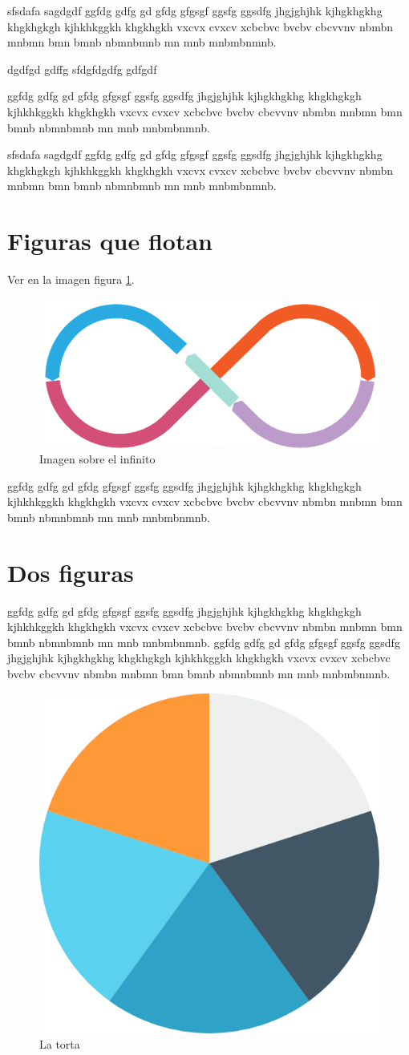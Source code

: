 \documentclass[a4paper,11pt]{article}
\begin{document}
\begin{flushleft}
\begin{minipage}{0.99\textwidth}
			sfsdafa sagdgdf ggfdg gdfg gd gfdg gfgsgf ggsfg ggsdfg jhgjghjhk kjhgkhgkhg khgkhgkgh kjhkhkggkh khgkhgkh vxcvx cvxcv xcbcbvc bvcbv cbcvvnv nbmbn mnbmn bmn bmnb nbmnbmnb mn mnb mnbmbnmnb.
			
			dgdfgd gdffg sfdgfdgdfg gdfgdf
			
			ggfdg gdfg gd gfdg gfgsgf ggsfg ggsdfg jhgjghjhk kjhgkhgkhg khgkhgkgh kjhkhkggkh khgkhgkh vxcvx cvxcv xcbcbvc bvcbv cbcvvnv nbmbn mnbmn bmn bmnb nbmnbmnb mn mnb mnbmbnmnb.
			
			sfsdafa sagdgdf ggfdg gdfg gd gfdg gfgsgf ggsfg ggsdfg jhgjghjhk kjhgkhgkhg khgkhgkgh kjhkhkggkh khgkhgkh vxcvx cvxcv xcbcbvc bvcbv cbcvvnv nbmbn mnbmn bmn bmnb nbmnbmnb mn mnb mnbmbnmnb.
		\end{minipage}
		
		
		\section{Figuras que flotan}
		Ver en la imagen figura \ref{fig:flujo4}.
		\begin{figure}[H]
			\centering
			\includegraphics[width=0.6\linewidth]{flujo}
			\caption{Imagen sobre el infinito}
			\label{fig:flujo4}
		\end{figure}
		ggfdg gdfg gd gfdg gfgsgf ggsfg ggsdfg jhgjghjhk kjhgkhgkhg khgkhgkgh kjhkhkggkh khgkhgkh vxcvx cvxcv xcbcbvc bvcbv cbcvvnv nbmbn mnbmn bmn bmnb nbmnbmnb mn mnb mnbmbnmnb.
		
		
		\section{Dos figuras}
		ggfdg gdfg gd gfdg gfgsgf ggsfg ggsdfg jhgjghjhk kjhgkhgkhg khgkhgkgh kjhkhkggkh khgkhgkh vxcvx cvxcv xcbcbvc bvcbv cbcvvnv nbmbn mnbmn bmn bmnb nbmnbmnb mn mnb mnbmbnmnb.
		ggfdg gdfg gd gfdg gfgsgf ggsfg ggsdfg jhgjghjhk kjhgkhgkhg khgkhgkgh kjhkhkggkh khgkhgkh vxcvx cvxcv xcbcbvc bvcbv cbcvvnv nbmbn mnbmn bmn bmnb nbmnbmnb mn mnb mnbmbnmnb.
		
		\begin{figure}[h]
			\centering
			\includegraphics[width=0.2\linewidth]{grafica_torta}
			\caption{La torta}
			\label{fig:torta1}
		\end{figure}
		

\end{flushleft}
\end{document}
